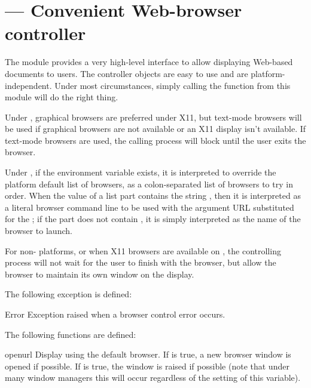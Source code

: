 \section{ ---
         Convenient Web-browser controller}


The  module provides a very high-level interface to
allow displaying Web-based documents to users.  The controller objects
are easy to use and are platform-independent.  Under most
circumstances, simply calling the  function from this
module will do the right thing.

Under \UNIX, graphical browsers are preferred under X11, but text-mode
browsers will be used if graphical browsers are not available or an X11
display isn't available.  If text-mode browsers are used, the calling
process will block until the user exits the browser.

Under \UNIX, if the environment variable  exists, it
is interpreted to override the platform default list of browsers, as a
colon-separated list of browsers to try in order.  When the value of
a list part contains the string , then it is interpreted as
a literal browser command line to be used with the argument URL
substituted for the ; if the part does not contain
, it is simply interpreted as the name of the browser to
launch.

For non-\UNIX{} platforms, or when X11 browsers are available on
\UNIX, the controlling process will not wait for the user to finish
with the browser, but allow the browser to maintain its own window on
the display.

The following exception is defined:

\begin{excdesc}{Error}
  Exception raised when a browser control error occurs.
\end{excdesc}

The following functions are defined:

\begin{funcdesc}{open}{url}
  Display  using the default browser.  If  is true,
  a new browser window is opened if possible.  If  is
  true, the window is raised if possible (note that under many window
  managers this will occur regardless of the setting of this variable).
\end{funcdesc}

